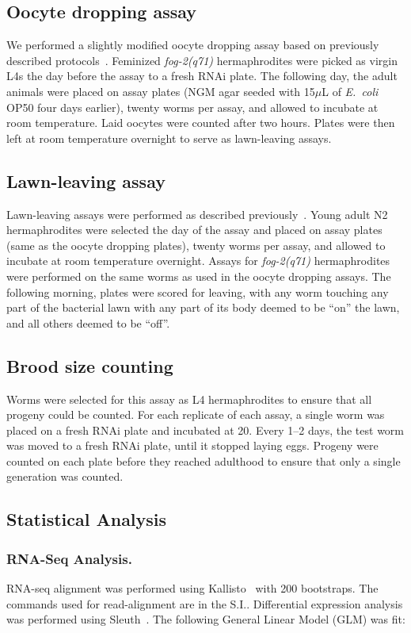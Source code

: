\documentclass[10pt,letterpaper,twocolumn]{article}
\newcommand{\fog}{\emph{fog-2}}
\newcommand{\ecol}{\emph{E.~coli}}
\begin{document}
\subsection*{Oocyte dropping assay}
\label{sb:oocyte_assay}
We performed a slightly modified oocyte dropping assay based on previously described protocols~\cite{White2012}. Feminized \fog{}\emph{(q71)} hermaphrodites were picked as virgin L4s the day before the assay to a fresh RNAi plate. The following day, the adult animals were placed on assay plates (NGM agar seeded with 15$\mu$L of \ecol{} OP50 four days earlier), twenty worms per assay, and allowed to incubate at room temperature. Laid oocytes were counted after two hours. Plates were then left at room temperature overnight to serve as lawn-leaving assays.

\subsection*{Lawn-leaving assay}
\label{sb:lawn_leaving}
Lawn-leaving assays were performed as described previously~\cite{Lipton2004}. Young adult N2 hermaphrodites were selected the day of the assay and placed on assay plates (same as the oocyte dropping plates), twenty worms per assay, and allowed to incubate at room temperature overnight. Assays for \fog{}\emph{(q71)} hermaphrodites were performed on the same worms as used in the oocyte dropping assays. The following morning, plates were scored for leaving, with any worm touching any part of the bacterial lawn with any part of its body deemed to be “on” the lawn, and all others deemed to be “off”.

\subsection*{Brood size counting}
\label{sb:brood_size}
Worms were selected for this assay as L4 hermaphrodites to ensure that all progeny could be counted. For each replicate of each assay, a single worm was placed on a fresh RNAi plate and incubated at 20\degree. Every 1--2 days, the test worm was moved to a fresh RNAi plate, until it stopped laying eggs. Progeny were counted on each plate before they reached adulthood to ensure that only a single generation was counted.

\subsection*{Statistical Analysis}
\label{sb:statistics}
\subsubsection*{RNA-Seq Analysis.}
RNA-seq alignment was performed using Kallisto~\cite{Bray2015} with 200 bootstraps. The commands used for read-alignment are in the S.I.. Differential expression analysis was performed using Sleuth~\cite{Pimentel2016}. The following General Linear Model (GLM) was fit:
\end{document}

